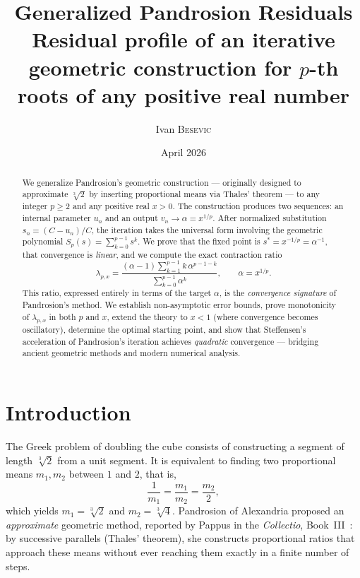 \documentclass[11pt,a4paper]{article}
\title{\textbf{Generalized Pandrosion Residuals}\\[0.3em]
  \large Residual profile of an iterative geometric construction
  for $p$-th roots of any positive real number}
\author{Ivan \textsc{Besevic}}
\date{April 2026}
\theoremstyle{definition}
\newcommand{\cbrt}[1]{\sqrt[3]{#1}}
\begin{document}
\maketitle

\begin{abstract}
We generalize Pandrosion's geometric construction --- originally designed to approximate $\cbrt{2}$ by inserting proportional means via Thales' theorem --- to any integer $p \geq 2$ and any positive real $x > 0$. The construction produces two sequences: an internal parameter $u_n$ and an output $v_n \to \alpha = x^{1/p}$. After normalized substitution $s_n = (C - u_n)/C$, the iteration takes the universal form involving the geometric polynomial $S_p(s) = \sum_{k=0}^{p-1} s^k$. We prove that the fixed point is $s^* = x^{-1/p} = \alpha^{-1}$, that convergence is \emph{linear}, and we compute the exact contraction ratio
\[
  \lambda_{p,x} = \frac{(\alpha - 1)\displaystyle\sum_{k=1}^{p-1} k\,\alpha^{p-1-k}}{\displaystyle\sum_{k=0}^{p-1} \alpha^k},
  \qquad \alpha = x^{1/p}.
\]
This ratio, expressed entirely in terms of the target $\alpha$, is the \emph{convergence signature} of Pandrosion's method. We establish non-asymptotic error bounds, prove monotonicity of $\lambda_{p,x}$ in both $p$ and $x$, extend the theory to $x < 1$ (where convergence becomes oscillatory), determine the optimal starting point, and show that Steffensen's acceleration of Pandrosion's iteration achieves \emph{quadratic} convergence --- bridging ancient geometric methods and modern numerical analysis.
\end{abstract}

\tableofcontents
\bigskip

\section{Introduction}

The Greek problem of doubling the cube consists of constructing a segment of length $\cbrt{2}$ from a unit segment. It is equivalent to finding two proportional means $m_1, m_2$ between $1$ and $2$, that is,
\[
  \frac{1}{m_1} = \frac{m_1}{m_2} = \frac{m_2}{2},
\]
which yields $m_1 = \cbrt{2}$ and $m_2 = \cbrt{4}$. Pandrosion of Alexandria proposed an \emph{approximate} geometric method, reported by Pappus in the \textit{Collectio}, Book~III~\cite{pappus}: by successive parallels (Thales' theorem), she constructs proportional ratios that approach these means without ever reaching them exactly in a finite number of steps.
\end{document}
